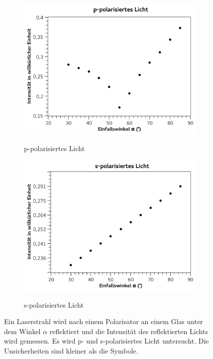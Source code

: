 \documentclass[
	a4paper,
	12pt,
	pagesize,
	ngerman
]{scrartcl}
\begin{document}
	\begin{figure}[H]
		\centering
		\begin{subfigure}[t]{0.5\textwidth}
			\centering
			\includegraphics[width=1\textwidth]{fig_ppol}
			\label{fig_ppol}
			\caption{p-polarisiertes Licht}
		\end{subfigure}%
		\begin{subfigure}[t]{0.5\textwidth}
			\centering
			\includegraphics[width=1\textwidth]{fig_spol}
			\label{fig_spol}
			\caption{s-polarisiertes Licht}
		\end{subfigure}
		\label{fig_pol}
		\caption{Ein Laserstrahl wird nach einem Polarisator an einem Glas unter dem Winkel $\alpha$ reflektiert und die Intensität des reflektierten Lichts wird gemessen. 
		Es wird p- und s-polarisiertes Licht untersucht.
		Die Unsicherheiten sind kleiner als die Symbole.}

	\end{figure}
\end{document}
